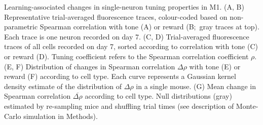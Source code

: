 \documentclass{article}
\begin{document}
Learning-associated changes in single-neuron tuning properties in M1. (A, B)
Representative trial-averaged fluorescence traces, colour-coded based on
non-parametric Spearman correlation with tone (A) or reward (B;\ gray traces at
top). Each trace is one neuron recorded on day 7. (C, D) Trial-averaged
fluorescence traces of all cells recorded on day 7, sorted according to
correlation with tone (C) or reward (D). Tuning coefficient refers to the
Spearman correlation coefficient $\rho$. (E, F) Distribution of changes in
Spearman correlation $\Delta \rho$ with tone (E) or reward (F) according to cell
type. Each curve represents a Gaussian kernel density estimate of the
distribution of $\Delta \rho$ in a single mouse. (G) Mean change in Spearman
correlation $\overline{\Delta \rho}$ according to cell type. Null distributions
(gray) estimated by re-sampling mice and shuffling trial times (see description
of Monte-Carlo simulation in Methods).
\end{document}
